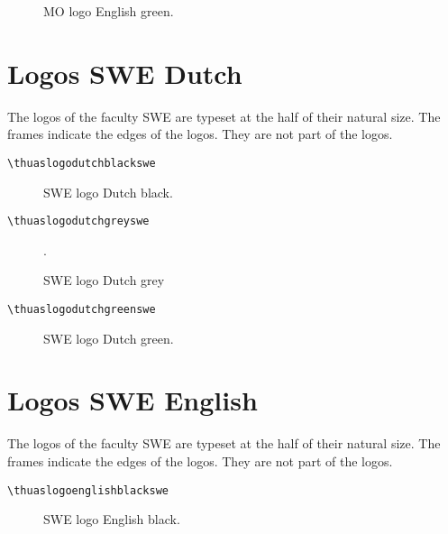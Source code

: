 \documentclass[a4paper,12pt]{article}
\begin{document}
\begin{figure}[H]
\centering\fboxsep=0pt%
\fbox{%
\scalebox{0.7071}{\thuaslogoenglishgreenmo}}
\caption{MO logo English green.}
\end{figure}


\section{Logos SWE Dutch}
The logos of the faculty SWE are typeset at the half of their natural size.
The frames indicate the edges of the logos. They are not part of the logos.

\begin{verbatim}
\thuaslogodutchblackswe
\end{verbatim}

\begin{figure}[H]
\centering\fboxsep=0pt%
\fbox{%
\scalebox{0.7071}{\thuaslogodutchblackswe}}
\caption{SWE logo Dutch black.}
\end{figure}

\begin{verbatim}
\thuaslogodutchgreyswe
\end{verbatim}

\begin{figure}[H]
\centering\fboxsep=0pt%
\fbox{%
\scalebox{0.7071}{\thuaslogodutchgreyswe}}
\caption{SWE logo Dutch grey}.
\end{figure}

\begin{verbatim}
\thuaslogodutchgreenswe
\end{verbatim}

\begin{figure}[H]
\centering\fboxsep=0pt%
\fbox{%
\scalebox{0.7071}{\thuaslogodutchgreenswe}}
\caption{SWE logo Dutch green.}
\end{figure}


\section{Logos SWE English}
The logos of the faculty SWE are typeset at the half of their natural size.
The frames indicate the edges of the logos. They are not part of the logos.

\begin{verbatim}
\thuaslogoenglishblackswe
\end{verbatim}

\begin{figure}[H]
\centering\fboxsep=0pt%
\fbox{%
\scalebox{0.7071}{\thuaslogoenglishblackswe}}
\caption{SWE logo English black.}
\end{figure}
\end{document}
